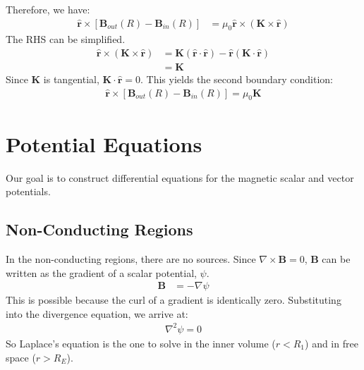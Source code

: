 \documentclass{article}
\begin{document}
Therefore, we have:
\begin{align}
    \mathbf{\hat{r}}\times[\mathbf{B}_{out}(R) - \mathbf{B}_{in}(R)] &= \mu_0\mathbf{\hat{r}}\times(\mathbf{K}\times\mathbf{\hat{r}})
\end{align}
The RHS can be simplified.
\begin{align}
    \mathbf{\hat{r}}\times(\mathbf{K}\times\mathbf{\hat{r}}) &= \mathbf{K}(\mathbf{\hat{r}}\cdot\mathbf{\hat{r}}) - \mathbf{\hat{r}}(\mathbf{K}\cdot\mathbf{\hat{r}}) \\
    &= \mathbf{K}
\end{align}
Since $\mathbf{K}$ is tangential, $\mathbf{K}\cdot\mathbf{\hat{r}}=0$. This yields the second boundary condition:
 \begin{align}
     \boxed{\mathbf{\hat{r}}\times[\mathbf{B}_{out}(R) - \mathbf{B}_{in}(R)] = \mu_0\mathbf{K}}
 \end{align}

\section{Potential Equations}
Our goal is to construct differential equations for the magnetic scalar and vector potentials.

\subsection*{Non-Conducting Regions}
In the non-conducting regions, there are no sources. Since $\nabla\times\mathbf{B} = 0$, $\mathbf{B}$ can be written as the gradient of a scalar potential, $\psi$.
\begin{align}
    \mathbf{B} &= -\nabla\psi
\end{align}
This is possible because the curl of a gradient is identically zero. Substituting into the divergence equation, we arrive at:
\begin{align}
    \nabla^2\psi = 0
\end{align}
So Laplace's equation is the one to solve in the inner volume ($r < R_1$) and in free space ($r>R_E$).
\end{document}

